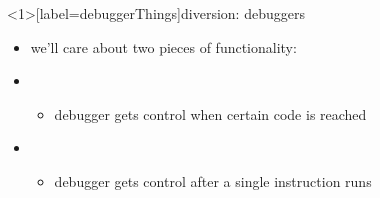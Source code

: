 
\begin{frame}<1>[label=debuggerThings]{diversion: debuggers}
    \begin{itemize}
    \item we'll care about two pieces of functionality:
    \vspace{.5cm}
    \item {}
        \begin{itemize}
        \item debugger gets control when certain code is reached
        \end{itemize}
    \item {}
        \begin{itemize}
        \item debugger gets control after a single instruction runs
        \end{itemize}
    \end{itemize}
\end{frame}


